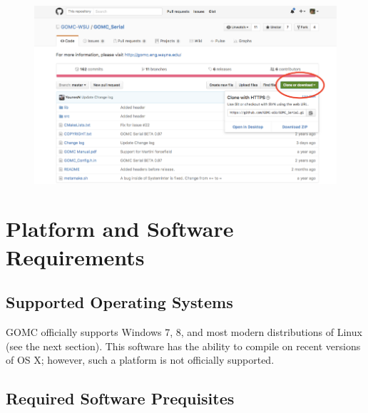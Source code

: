 \begin{figure}[H]
\centering
\includegraphics[scale=0.8]{images/clone}
\end{figure}

\section{Platform and Software Requirements}

\subsection{Supported Operating Systems}

GOMC officially supports Windows 7, 8, and most modern distributions of Linux (see the next section).  This software has the ability to compile on recent versions of OS X; however, such a platform is not officially supported. 

\subsection{Required Software Prequisites}

